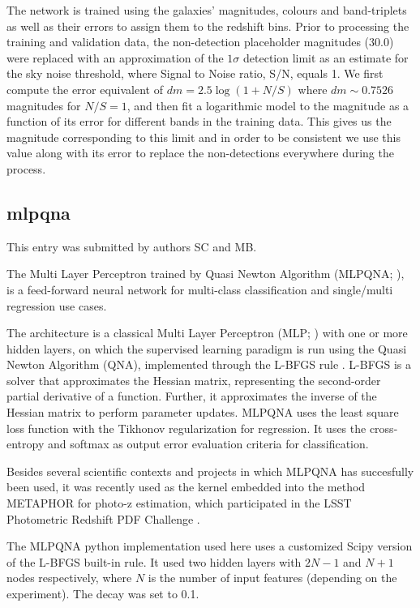 \documentclass[twocolumn,twocolappendix]{aastex63}
\begin{document}
The network is trained using the galaxies' magnitudes, colours and band-triplets as well as their errors to assign them to 
the redshift bins.
Prior to processing the training and validation data, the non-detection placeholder magnitudes (30.0) were replaced with 
an approximation of the $1\sigma$ detection limit as an estimate for the sky noise threshold, where Signal to Noise ratio, 
S/N, equals 1. We first compute the error equivalent of $dm = 2.5 \log(1 + N/S)$ where $dm \sim 0.7526$ 
magnitudes for $N/S = 1$, and then fit a logarithmic model to the magnitude as a function of its error 
for different bands in the training data. This gives us the magnitude corresponding to this limit 
and in order to be consistent we use this value along with its error to replace the non-detections 
everywhere during the process.



\subsection{ {\sc mlpqna} }
This entry was submitted by authors SC and MB.

The Multi Layer Perceptron trained by Quasi Newton Algorithm 
({\sc MLPQNA}; \citealp{Brescia12}), is a feed-forward neural network 
for multi-class classification and single/multi regression use cases.

The architecture is a classical Multi Layer Perceptron (MLP; \citealp{Rosenblatt1961})
with one or more hidden layers, on which the supervised learning paradigm is run
using the Quasi Newton Algorithm (QNA), implemented through the L-BFGS rule
\citep{Nocedal80}. L-BFGS is a solver that approximates the Hessian matrix,
representing the second-order partial derivative of a function. Further, it
approximates the inverse of the Hessian matrix to perform parameter updates.
MLPQNA uses the least square loss function with the Tikhonov regularization
\citep{Tikhonov77} for regression. It uses the cross-entropy \citep{deBoer05}
and softmax \citep{Sutton98} as output error evaluation criteria for
classification.

Besides several scientific contexts and projects in which MLPQNA has succesfully
been used, it was recently used as the kernel embedded into the method {\sc
METAPHOR} \citep{cavuoti20} for photo-z estimation, which participated in the
LSST Photometric Redshift PDF Challenge \citep{schmidt20}. 

The {\sc MLPQNA} python implementation used here
uses a customized Scipy version of the L-BFGS built-in rule.
It used two hidden layers with $2N-1$ and $N+1$ nodes respectively,
where $N$ is the number of input features (depending on the experiment).
The decay was set to 0.1.
\end{document}
